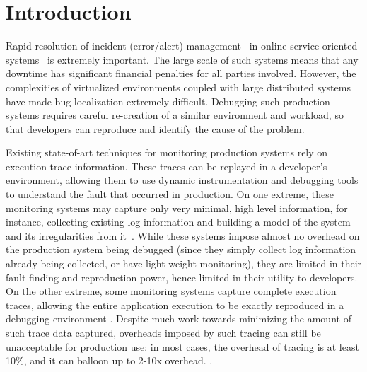\section{Introduction}
\label{sec:parikshanIntro}

Rapid resolution of incident (error/alert) management~\cite{sasase2013} in online service-oriented systems~\cite{microservice-book,hdfs,cassandra,redis} is extremely important.
The large scale of such systems means that any downtime has significant financial penalties for all parties involved.
However, the complexities of virtualized environments coupled with large distributed systems have made bug localization extremely difficult.
Debugging such production systems requires careful re-creation of a similar
environment and workload, so that developers can reproduce and identify the cause of the problem.

Existing state-of-art techniques for monitoring production systems rely on execution trace information. 
These traces can be replayed in a developer's environment, allowing them to use dynamic instrumentation and debugging tools to understand the fault that occurred in production.
On one extreme, these monitoring systems may capture only very minimal, high
level information, for instance, collecting existing log information and
building a model of the system and its irregularities from it~\cite{magpie,fay,failuresketching,problemsolvingSysTap}. 
While these systems impose almost no overhead on the production system being
debugged (since they simply collect log information already being collected, or
have light-weight monitoring), they are limited in their fault finding and reproduction power, hence limited in their utility to developers.
On the other extreme, some monitoring systems capture complete execution traces, allowing the entire application execution to be exactly reproduced in a debugging environment \cite{odr,revirt,laadan2010transparent,geels2007friday}.
Despite much work towards minimizing the amount of such trace data captured, overheads imposed by such tracing can still be unacceptable for production use: in most cases, the overhead of tracing is at least 10\%, and it can balloon up to 2-10x overhead. \cite{pinplay,drdebug}.

